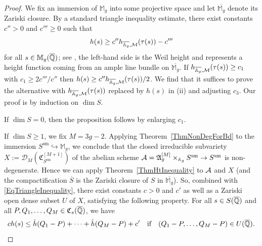 \begin{proof}
  We fix an immersion of $\mathbb{M}_g$ into
  some projective space and let $\overline{\mathbb{M}_g}$ denote its
  Zariski closure. 
By a standard triangle inequality estimate, there exist constants
$c''>0$ and $c'''\ge 0$ such that
\begin{equation}\label{EqTriangleInequality}
h(s) \ge  c'' h_{\overline{\mathbb{A}_g},{\mathcal M}}(\tau(s)) - c'''
\end{equation}
for all $s \in \mathbb{M}_g({\overline{\mathbb{Q}}})$; see
\cite[Lemma~4]{Silverman:heightest11}, the left-hand side is the Weil
height and represents a height function coming from an ample line
bundle on $\overline{\mathbb{M}_g}$.
If $h_{\overline{\mathbb{A}_g},{\mathcal M}}(\tau(s))\ge c_1$ with $c_1\ge
2 c'''/c''$
then $h(s) \ge c''
h_{\overline{\mathbb{A}_g},{\mathcal M}}(\tau(s))/2$. We find that it suffices to
prove the alternative with $h_{\overline{\mathbb{A}_g},{\mathcal M}}(\tau(s))$
replaced by $h(s)$ in (ii) and adjusting $c_3$. 
Our proof is by induction on $\dim S$.

If $\dim S = 0$, then the proposition follows by enlarging $c_1$.

If $\dim S\ge 1$, we fix $M = 3g-2$.
Applying
Theorem~\ref{ThmNonDegForBd} to the immersion
 $S^{\mathrm{sm}} \hookrightarrow \mathbb{M}_g$,
we conclude that the closed irreducible subvariety
 $X:=\mathscr{D}_M(\mathfrak{C}_{S^{\mathrm{sm}}}^{[M+1]})$
of the abelian scheme
$\mathcal{A}=\mathfrak{A}_g^{[M]}\times_{\mathbb{A}_g} S^{\mathrm{sm}} \rightarrow
S^{\mathrm{sm}}$
is non-degenerate. Hence we can apply Theorem~\ref{ThmHtInequality} to
$\mathcal{A}$ %
and 
$X$
(and the compactification $\overline{S}$ is the Zariski closure of $S$ in $\overline{\mathbb{M}_g}$). 
So, combined with \eqref{EqTriangleInequality}, there exist constants
$c > 0$ and $c'$ as well as a Zariski open dense subset $U$ of
$X$,
satisfying the following property.
For all $s \in S({\overline{\mathbb{Q}}})$ and
all $P, Q_1,\ldots,Q_M \in \mathfrak{C}_s({\overline{\mathbb{Q}}})$, we have
\begin{equation}\label{EqHtInequalityBdRatPt} 
c h(s)\le 
\hat{h}(Q_1-P) + \cdots + \hat{h}(Q_M - P) + c' \quad
\text{if}\quad (Q_1-P,\ldots, Q_M-P) \in U({\overline{\mathbb{Q}}}).
\end{equation}


\end{proof}

